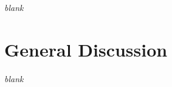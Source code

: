 \documentclass[smallextended]{svjour3}       %
\begin{document}
\begin{center}
\textit{blank}
\end{center}

\section{General Discussion}
\label{sec:discussion}


\begin{center}
\textit{blank}
\end{center}





\end{document}

